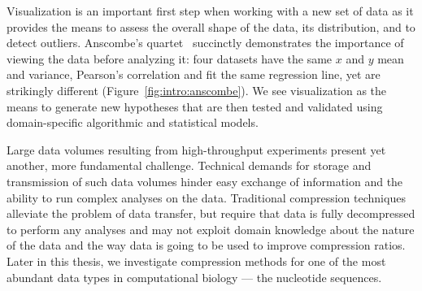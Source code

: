 \documentclass[12pt]{cmuthesis}
\begin{document}

Visualization is an important first step when working with a new set of data as it provides the means to assess the overall shape of the data, its distribution, and to detect outliers. Anscombe's quartet~\cite{anscombe} succinctly demonstrates the importance of viewing the data before analyzing it: four datasets have the same $x$ and $y$ mean and variance, Pearson's correlation and fit the same regression line, yet are strikingly different (Figure~\ref{fig:intro:anscombe}). We see visualization as the means to generate new hypotheses that are then tested and validated using domain-specific algorithmic and statistical models.



Large data volumes resulting from high-throughput experiments present yet another, more fundamental challenge. Technical demands for storage and transmission of such data volumes hinder easy exchange of information and the ability to run complex analyses on the data. Traditional compression techniques alleviate the problem of data transfer, but require that data is fully decompressed to perform any analyses and may not exploit domain knowledge about the nature of the data and the way data is going to be used to improve compression ratios. Later in this thesis, we investigate compression methods for one of the most abundant data types in computational biology --- the nucleotide sequences.




\end{document}
